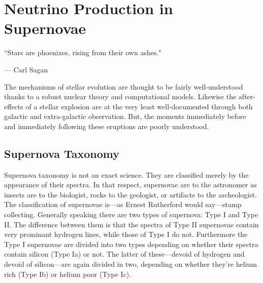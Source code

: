 %
%
%
%


\chapter{Neutrino Production in Supernovae}
	\label{supernovae_chapter}

	\vspace{-0.2in}

	\begin{quoting}
		\noindent \large ``Stars are phoenixes, rising from their own ashes." \normalsize

		--- Carl Sagan
	\end{quoting}

	 The mechanisms of stellar evolution are thought to be fairly well-understood thanks to a robust nuclear theory and computational models. Likewise the after-effects of a stellar explosion are at the very least well-documented through both galactic and extra-galactic observation. But, the moments immediately before and immediately following these eruptions are poorly understood. 
	
	\section{Supernova Taxonomy}
		Supernova taxonomy is not an exact science. They are classified merely by the appearance of their spectra. In that respect, supernovae are to the astronomer as insects are to the biologist, rocks to the geologist, or artifacts to the archeologist. The classification of supernovae is---as Ernest Rutherford would say---stamp collecting. 
		Generally speaking there are two types of supernova: Type I and Type II. The difference between them is that the spectra of Type II supernovae contain very prominant hydrogen lines, while those of Type I do not. Furthermore the Type I supernovae are divided into two types depending on whether their spectra contain silicon (Type Ia) or not. The latter of these---devoid of hydrogen and devoid of silicon---are again divided in two, depending on whether they're helium rich (Type Ib) or helium poor (Type Ic).

